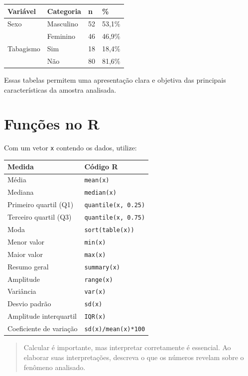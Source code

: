 \documentclass[
]{book}
\begin{document}
\begin{longtable}[]{@{}llll@{}}
\toprule\noalign{}
Variável & Categoria & n & \% \\
\midrule\noalign{}
\endhead
\bottomrule\noalign{}
\endlastfoot
Sexo & Masculino & 52 & 53,1\% \\
& Feminino & 46 & 46,9\% \\
Tabagismo & Sim & 18 & 18,4\% \\
& Não & 80 & 81,6\% \\
\end{longtable}

Essas tabelas permitem uma apresentação clara e objetiva das principais características da amostra analisada.

\section{Funções no R}\label{funuxe7uxf5es-no-r}

Com um vetor \texttt{x} contendo os dados, utilize:

\begin{longtable}[]{@{}ll@{}}
\toprule\noalign{}
Medida & Código R \\
\midrule\noalign{}
\endhead
\bottomrule\noalign{}
\endlastfoot
Média & \texttt{mean(x)} \\
Mediana & \texttt{median(x)} \\
Primeiro quartil (Q1) & \texttt{quantile(x,\ 0.25)} \\
Terceiro quartil (Q3) & \texttt{quantile(x,\ 0.75)} \\
Moda & \texttt{sort(table(x))} \\
Menor valor & \texttt{min(x)} \\
Maior valor & \texttt{max(x)} \\
Resumo geral & \texttt{summary(x)} \\
Amplitude & \texttt{range(x)} \\
Variância & \texttt{var(x)} \\
Desvio padrão & \texttt{sd(x)} \\
Amplitude interquartil & \texttt{IQR(x)} \\
Coeficiente de variação & \texttt{sd(x)/mean(x)*100} \\
\end{longtable}

\begin{quote}
Calcular é importante, mas interpretar corretamente é essencial. Ao elaborar suas interpretações, descreva o que os números revelam sobre o fenômeno analisado.
\end{quote}
\end{document}
